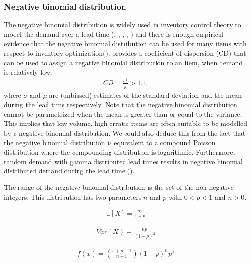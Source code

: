 \documentclass{article}
\begin{document}
\subsubsection{Negative binomial distribution}
\begin{flushleft}
    The negative binomial distribution is widely used in inventory control theory to model the demand over a lead time (\cite{NBN}, \cite{doi:10.1287/mnsc.25.8.777}, \cite{doi:10.1287/opre.33.1.134}, \cite{SYNTETOS200636}, \cite{doi:10.1057/jors.1961.8}) and there is enough empirical evidence that the negative binomial distribution can be used for many items with respect to inventory optimization(\cite{10db68d2-3b29-3c0c-a083-406d6a06c09e}).
    \cite{RePEc:spr:isorms:978-3-319-15729-0} provides a coefficient of dispersion (CD) that can be used to assign a negative binomial distribution to an item, when demand is relatively low:
    \begin{align*}
        CD = \frac{\sigma^2}{\mu} > 1.1,
    \end{align*}
    where $\sigma$ and $\mu$ are (unbiased) estimates of the standard deviation and the mean during the lead time respectively.
    Note that the negative binomial distribution cannot be parametrized when the mean is greater than or equal to the variance.
    This implies that low volume, high erratic items are often suitable to be modelled by a negative binomial distribution.
    We could also deduce this from the fact that the negative binomial distribution is equivalent to a compound Poisson distribution where the compounding distribution is logarithmic.
    Furthermore, random demand with gamma distributed lead times results in negative binomial distributed demand during the lead time (\cite{207bf20a-108d-3b3d-9619-1f323adac508}).
\end{flushleft}
\begin{flushleft}
    The range of the negative binomial distribution is the set of the non-negative integers.
    This distribution has two parameters $n$ and $p$ with $0 < p < 1$ and $n > 0$.
\end{flushleft}
\begin{align*}
    \mathbb{E}[X] = \frac{np}{1-p}
\end{align*}

\begin{align*}
    Var(X) = \frac{np}{(1-p)^2}
\end{align*}

\begin{align*}
    f(x) = {\binom{x+n-1}{n-1}}(1-p)^np^x
\end{align*}
\end{document}
